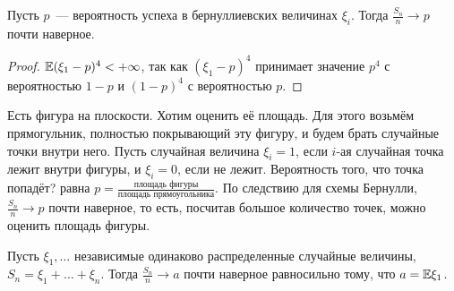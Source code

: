  \begin{corollary} Пусть $p$~--- вероятность успеха в бернуллиевских величинах $\xi_i$.
     Тогда $\frac{S_n}{n}\rightarrow p$ почти наверное.
 \end{corollary}

 \begin{proof}
     $\mathbb{E} (\xi_1 - p)^4<+\infty$, так как $(\xi_1 - p)^4$ принимает значение $p^4$ с вероятностью $1-p$ и $(1- p)^4$ с вероятностью $p$.
 \end{proof}


 \begin{example}
     Есть фигура на плоскости. Хотим оценить её площадь. Для этого возьмём прямогульник, полностью покрывающий эту фигуру, и будем брать случайные точки внутри него. Пусть случайная величина $\xi_i = 1$, если $i$-ая случайная точка лежит внутри фигуры, и $\xi_i = 0$, если не лежит. Вероятность того, что точка попадёт? равна
     $p = \frac{\text{площадь фигуры}}{\text{площадь прямоугольника}}$.
    По следствию для схемы Бернулли, $\frac{S_n}{n}\rightarrow p$ почти наверное, то есть, посчитав большое количество точек, можно оценить площадь фигуры.
 \end{example}

 \begin{theorem} 
    Пусть $\xi_1, \ldots$ независимые одинаково распределенные случайные величины,
     $S_n = \xi_1 + \ldots + \xi_n$. Тогда $\frac{S_n}{n}\rightarrow a$ почти наверное равносильно тому, что $a=\mathbb{E} \xi_1$.
 \end{theorem}
 